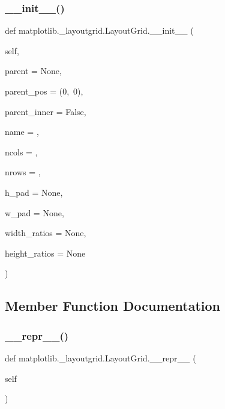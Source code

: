 \subsubsection{\texorpdfstring{\+\_\+\+\_\+init\+\_\+\+\_\+()}{\_\_init\_\_()}}
{\footnotesize\ttfamily def matplotlib.\+\_\+layoutgrid.\+Layout\+Grid.\+\_\+\+\_\+init\+\_\+\+\_\+ (\begin{DoxyParamCaption}\item[{}]{self,  }\item[{}]{parent = {\ttfamily None},  }\item[{}]{parent\+\_\+pos = {\ttfamily (0,~0)},  }\item[{}]{parent\+\_\+inner = {\ttfamily False},  }\item[{}]{name = {\ttfamily \textquotesingle{}\textquotesingle{}},  }\item[{}]{ncols = {},  }\item[{}]{nrows = {},  }\item[{}]{h\+\_\+pad = {\ttfamily None},  }\item[{}]{w\+\_\+pad = {\ttfamily None},  }\item[{}]{width\+\_\+ratios = {\ttfamily None},  }\item[{}]{height\+\_\+ratios = {\ttfamily None} }\end{DoxyParamCaption})}



\subsection{Member Function Documentation}
\mbox{\label{classmatplotlib_1_1__layoutgrid_1_1LayoutGrid_ac417a600ff5b122d89c5d70a9da55f46}} 
\subsubsection{\texorpdfstring{\+\_\+\+\_\+repr\+\_\+\+\_\+()}{\_\_repr\_\_()}}
{\footnotesize\ttfamily def matplotlib.\+\_\+layoutgrid.\+Layout\+Grid.\+\_\+\+\_\+repr\+\_\+\+\_\+ (\begin{DoxyParamCaption}\item[{}]{self }\end{DoxyParamCaption})}

